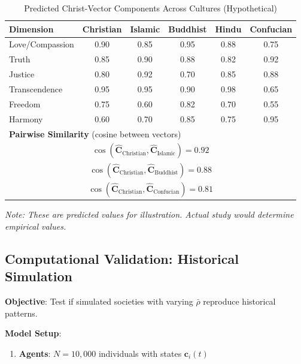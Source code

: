 \documentclass[11pt,a4paper]{article}
\theoremstyle{definition}
\theoremstyle{remark}
\newcommand{\cc}{\mathbf{c}}
\begin{document}
\begin{small}
\begin{enumerate}
\begin{table}[H]
\centering
\caption{Predicted Christ-Vector Components Across Cultures (Hypothetical)}
\label{tab:cross_cultural_C}
\begin{tabular}{|l|c|c|c|c|c|}
\hline
\textbf{Dimension} & \textbf{Christian} & \textbf{Islamic} & \textbf{Buddhist} & \textbf{Hindu} & \textbf{Confucian} \\
\hline
Love/Compassion & 0.90 & 0.85 & 0.95 & 0.88 & 0.75 \\
\hline
Truth & 0.85 & 0.90 & 0.88 & 0.82 & 0.92 \\
\hline
Justice & 0.80 & 0.92 & 0.70 & 0.85 & 0.88 \\
\hline
Transcendence & 0.95 & 0.95 & 0.90 & 0.98 & 0.65 \\
\hline
Freedom & 0.75 & 0.60 & 0.82 & 0.70 & 0.55 \\
\hline
Harmony & 0.60 & 0.70 & 0.85 & 0.75 & 0.95 \\
\hline
\multicolumn{6}{|l|}{\textbf{Pairwise Similarity} (cosine between vectors)} \\
\hline
\multicolumn{6}{|c|}{\(\cos(\hat{\mathbf{C}}_{\text{Christian}}, \hat{\mathbf{C}}_{\text{Islamic}}) = 0.92\)} \\
\multicolumn{6}{|c|}{\(\cos(\hat{\mathbf{C}}_{\text{Christian}}, \hat{\mathbf{C}}_{\text{Buddhist}}) = 0.88\)} \\
\multicolumn{6}{|c|}{\(\cos(\hat{\mathbf{C}}_{\text{Christian}}, \hat{\mathbf{C}}_{\text{Confucian}}) = 0.81\)} \\
\hline
\end{tabular}
\end{table}

\textit{Note: These are predicted values for illustration. Actual study would determine empirical values.}

\subsection{Computational Validation: Historical Simulation}

\begin{protocol}
\textbf{Objective}: Test if simulated societies with varying \(\bar{\rho}\) reproduce historical patterns.

\textbf{Model Setup}:
\begin{enumerate}
    \item \textbf{Agents}: \(N = 10{,}000\) individuals with states \(\cc_i(t)\)
    

\end{enumerate}
\end{protocol}
\end{enumerate}
\end{small}
\end{document}
